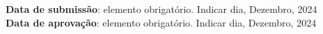 \begin{center}\smaller
    \textbf{Data de submissão}: elemento obrigatório. Indicar dia, Dezembro, 2024 \\
    \textbf{Data de aprovação}: elemento obrigatório. Indicar dia, Dezembro, 2024
\end{center}